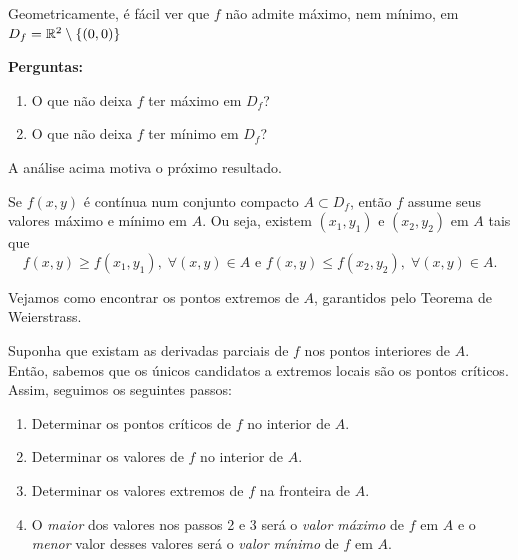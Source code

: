 Geometricamente, é fácil ver que \(f\) não admite máximo, nem mínimo, em \(D_f = \mathbb{R}^2\setminus\{(0,0)\}\)

\textbf{Perguntas: }
    \begin{enumerate}
        \item O que não deixa \(f\) ter máximo em \(D_f\)?
        \item O que não deixa \(f\) ter mínimo em \(D_f\)?
    \end{enumerate}

A análise acima motiva o próximo resultado.

\begin{theorem}[Weierstrass]\label{thm.Weierstrass}
    Se \(f(x,y)\) é contínua num conjunto compacto \(A \subset D_f\), então \(f\) assume seus valores máximo e mínimo em \(A\). Ou seja, existem \((x_1,y_1)\) e \((x_2,y_2)\) em \(A\) tais que \[f(x,y) \geq f(x_1,y_1),\; \forall (x,y)\in A \text{ e } f(x,y) \leq f(x_2,y_2),\; \forall (x,y)\in A.\]
\end{theorem}

Vejamos como encontrar os pontos extremos de \(A\), garantidos pelo Teorema de Weierstrass.

Suponha que existam as derivadas parciais de \(f\) nos pontos interiores de \(A\). Então, sabemos que os únicos candidatos a extremos locais são os pontos críticos. Assim, seguimos os seguintes passos:
    \begin{enumerate}
        \item Determinar os pontos críticos de \(f\) no interior de \(A\).
        \item Determinar os valores de \(f\) no interior de \(A\).
        \item Determinar os valores extremos de \(f\) na fronteira de \(A\).
        \item O \textit{maior} dos valores nos passos 2 e 3 será o \textit{valor máximo} de \(f\) em \(A\) e o \textit{menor} valor desses valores será o \textit{valor mínimo} de \(f\) em \(A\).
    \end{enumerate}

